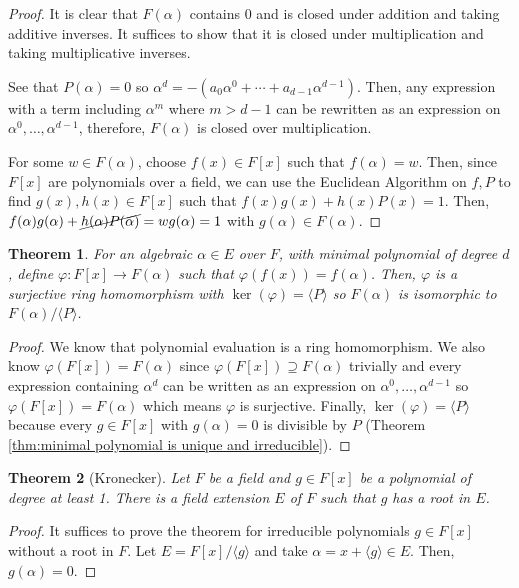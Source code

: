 \documentclass[
    parskip=half,
    toc=flat,
    toc=sectionentrydotfill,
]{scrartcl}  %
\theoremstyle{definition}
\theoremstyle{plain}
\newtheorem{theorem}{Theorem}[definition]
\theoremstyle{remark}
\begin{document}
\begin{proof}
    It is clear that $F(\alpha)$ contains $0$ and is closed under addition and taking additive
    inverses.
    It suffices to show that it is closed under multiplication and taking multiplicative inverses.

    See that $P(\alpha)=0$ so $\alpha^d=-(a_0\alpha^0+\cdots+a_{d-1}\alpha^{d-1})$.
    Then, any expression with a term including $\alpha^m$ where $m>d-1$ can be rewritten as an
    expression on $\alpha^0,\dots,\alpha^{d-1}$, therefore, $F(\alpha)$ is closed over
    multiplication.

    For some $w\in F(\alpha)$, choose $f(x)\in F[x]$ such that $f(\alpha)=w$.
    Then, since $F[x]$ are polynomials over a field, we can use the Euclidean Algorithm on $f,P$ to
    find $g(x),h(x)\in F[x]$ such that $f(x)g(x)+h(x)P(x)=1$.
    Then, $f(\alpha)g(\alpha)+\cancel{h(\alpha)P(\alpha)}=wg(\alpha)=1$ with
    $g(\alpha)\in F(\alpha)$.
\end{proof}

\begin{theorem}
    For an algebraic $\alpha\in E$ over $F$, with minimal polynomial of degree $d$, define
    $\varphi:F[x]\to F(\alpha)$ such that $\varphi(f(x))=f(\alpha)$.
    Then, $\varphi$ is a surjective ring homomorphism with $\ker(\varphi)=\langle P\rangle$ so
    $F(\alpha)$ is isomorphic to $F(\alpha)/\langle P\rangle$.
\end{theorem}

\begin{proof}
    We know that polynomial evaluation is a ring homomorphism.
    We also know $\varphi(F[x])=F(\alpha)$ since $\varphi(F[x])\supseteq F(\alpha)$ trivially and
    every expression containing $\alpha^d$ can be written as an expression on
    $\alpha^0,\dots,\alpha^{d-1}$ so $\varphi(F[x])=F(\alpha)$ which means $\varphi$ is surjective.
    Finally, $\ker(\varphi)=\langle P\rangle$ because every $g\in F[x]$ with $g(\alpha)=0$ is
    divisible by $P$ (Theorem \ref{thm:minimal polynomial is unique and irreducible}).
\end{proof}


\begin{theorem}[Kronecker]
    Let $F$ be a field and $g\in F[x]$ be a polynomial of degree at least 1.
    There is a field extension $E$ of $F$ such that $g$ has a root in $E$.
\end{theorem}

\begin{proof}
    It suffices to prove the theorem for irreducible polynomials $g\in F[x]$ without a root in $F$.
    Let $E=F[x]/\langle g\rangle$ and take $\alpha=x+\langle g\rangle\in E$.
    Then, $g(\alpha)=0$.
\end{proof}
\end{document}

